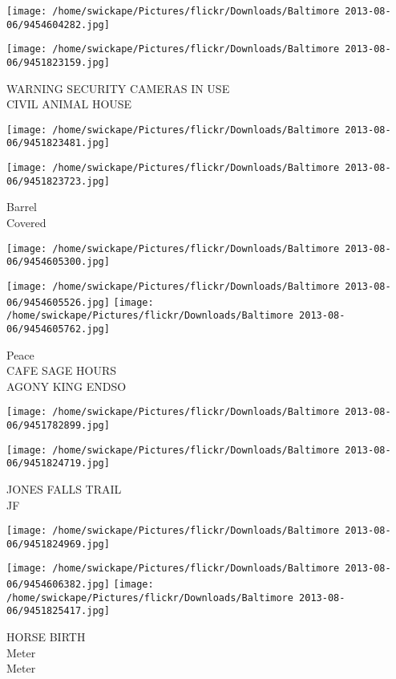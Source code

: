 \documentclass[10pt,letterpaper]{article}
\begin{document}
\texttt{[image: /home/swickape/Pictures/flickr/Downloads/Baltimore 2013-08-06/9454604282.jpg]}

\vspace{0.25in}
\texttt{[image: /home/swickape/Pictures/flickr/Downloads/Baltimore 2013-08-06/9451823159.jpg]}

WARNING SECURITY CAMERAS IN USE\\
CIVIL ANIMAL HOUSE
\pagebreak

\texttt{[image: /home/swickape/Pictures/flickr/Downloads/Baltimore 2013-08-06/9451823481.jpg]}

\vspace{0.25in}
\texttt{[image: /home/swickape/Pictures/flickr/Downloads/Baltimore 2013-08-06/9451823723.jpg]}

Barrel\\
Covered
\pagebreak

\texttt{[image: /home/swickape/Pictures/flickr/Downloads/Baltimore 2013-08-06/9454605300.jpg]}

\vspace{0.25in}
\texttt{[image: /home/swickape/Pictures/flickr/Downloads/Baltimore 2013-08-06/9454605526.jpg]}
\texttt{[image: /home/swickape/Pictures/flickr/Downloads/Baltimore 2013-08-06/9454605762.jpg]}

Peace\\
CAFE SAGE HOURS\\
AGONY KING ENDSO
\pagebreak

\texttt{[image: /home/swickape/Pictures/flickr/Downloads/Baltimore 2013-08-06/9451782899.jpg]}

\vspace{0.25in}
\texttt{[image: /home/swickape/Pictures/flickr/Downloads/Baltimore 2013-08-06/9451824719.jpg]}

JONES FALLS TRAIL\\
JF
\pagebreak

\texttt{[image: /home/swickape/Pictures/flickr/Downloads/Baltimore 2013-08-06/9451824969.jpg]}

\vspace{0.25in}
\texttt{[image: /home/swickape/Pictures/flickr/Downloads/Baltimore 2013-08-06/9454606382.jpg]}
\texttt{[image: /home/swickape/Pictures/flickr/Downloads/Baltimore 2013-08-06/9451825417.jpg]}

HORSE BIRTH\\
Meter\\
Meter
\pagebreak
\end{document}
